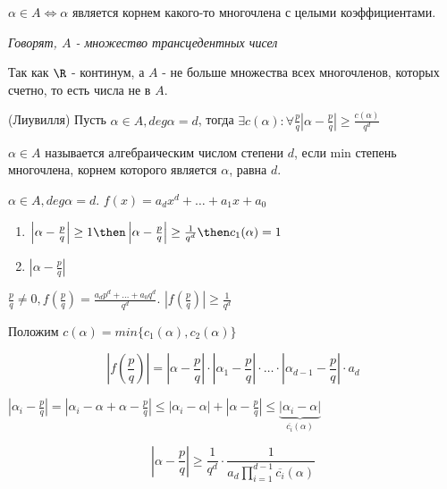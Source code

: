 \begin{definition}
  $\alpha \in A \Longleftrightarrow \alpha$ является корнем какого-то многочлена с целыми коэффициентами.

  \textit{Говорят, $A$ - множество трансцедентных чисел}
\end{definition}

\begin{note}
  Так как $\R$ - континум, а $A$ - не больше множества всех многочленов, которых счетно, то есть числа не в $A$.
\end{note}

\begin{theorem}{(Лиувилля)} Пусть $\alpha \in A, deg \alpha = d$, тогда $\exists c(\alpha): \forall \frac{p}{q} \left|\alpha - \frac{p}{q}\right| \ge \frac{c(\alpha)}{q^d} $
  
\end{theorem}

\begin{definition}
  $\alpha \in A$ называется алгебраическим числом степени $d$, если min степень многочлена, корнем которого является $\alpha$, равна $d$.
\end{definition}

$\alpha \in A, deg \alpha = d$. $f(x) = a_d x^d + \dots + a_1x + a_0$

\begin{enumerate}
  \item $\left|\alpha - \frac{p}{q}\right| \ge 1 \then \left|\alpha - \frac{p}{q}\right|  \ge \frac{1}{q^d} \then c_1(\alpha) = 1$
  \item $\left| \alpha - \frac{p}{q}\right|$
\end{enumerate}
$\frac{p}{q} \ne 0, f(\frac{p}{q}) = \frac{a_d p^d + \dots + a_0 q^d}{q^d}$. $\left|f(\frac{p}{q})\right|\ge \frac{1}{q^d}$

Положим $c(\alpha) = min\{c_1(\alpha), c_2(\alpha)\}$

$$\left|f\left(\frac{p}{q}\right)\right| = \left|\alpha - \frac{p}{q}\right| \cdot \left|\alpha_1 - \frac{p}{q}\right| \cdot \dots \cdot \left|\alpha_{d-1} - \frac{p}{q}\right| \cdot a_d$$ 

$\left|\alpha_i - \frac{p}{q}\right| = \left| \alpha_i - \alpha + \alpha - \frac{p}{q}\right| \le \left|\alpha_i - \alpha \right| + \left|\alpha - \frac{p}{q}\right| \le \underbrace{\left|\alpha_i - \alpha \right|}_{\overline{c_i}(\alpha)}$

$$\left|\alpha - \frac{p}{q}\right| \ge \frac{1}{q^d} \cdot \frac{1}{a_d \prod_{i = 1}^{d - 1} \overline{c_i}(\alpha)}$$